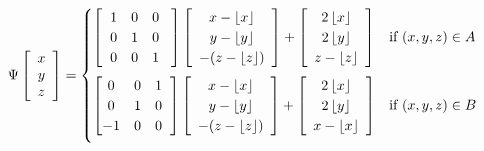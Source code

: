 \documentclass[]{article}
\begin{document}
\begin{equation}
\Psi\left[\begin{array}{c}
	x\\y\\z
\end{array}\right] 
= 
\begin{cases}
	\left[ \hspace{2mm} \begin{matrix}
		1 & 0 & 0 \\
		0 & 1 & 0 \\
		0 & 0 & 1
	\end{matrix}\hspace{3mm}\right]

	\left[\begin{array}{c}
	x - \left\lfloor x \right\rfloor
	\\ y- \left\lfloor y \right\rfloor
	\\ -(z - \left\lfloor z \right\rfloor)
	\end{array} \right]
	+
	\left[\begin{array}{c}
		2 \left\lfloor x \right\rfloor
		\\ 2\left\lfloor y \right\rfloor
		\\ z - \left\lfloor z \right\rfloor
	\end{array} \right]
		& \text{if } (x,y,z)\in A	\vspace{2mm}
	\\
		
		
	\left[ \begin{matrix}
	0 & 0 & 1 \\
	0 & 1 & 0 \\
	-1 & 0 & 0
	\end{matrix}\hspace{2mm}\right]
	\left[\begin{array}{c}
		x - \left\lfloor x \right\rfloor
		\\ y- \left\lfloor y \right\rfloor
		\\ -(z - \left\lfloor z \right\rfloor)
		\end{array} \right]
	+
		\left[\begin{array}{c}
			2 \left\lfloor x \right\rfloor
			\\ 2\left\lfloor y \right\rfloor
			\\ x - \left\lfloor x \right\rfloor
		\end{array} \right]
			& \text{if } (x,y,z)\in B	\vspace{2mm}
	\\
	

\end{cases}
\end{equation}
\end{document}
